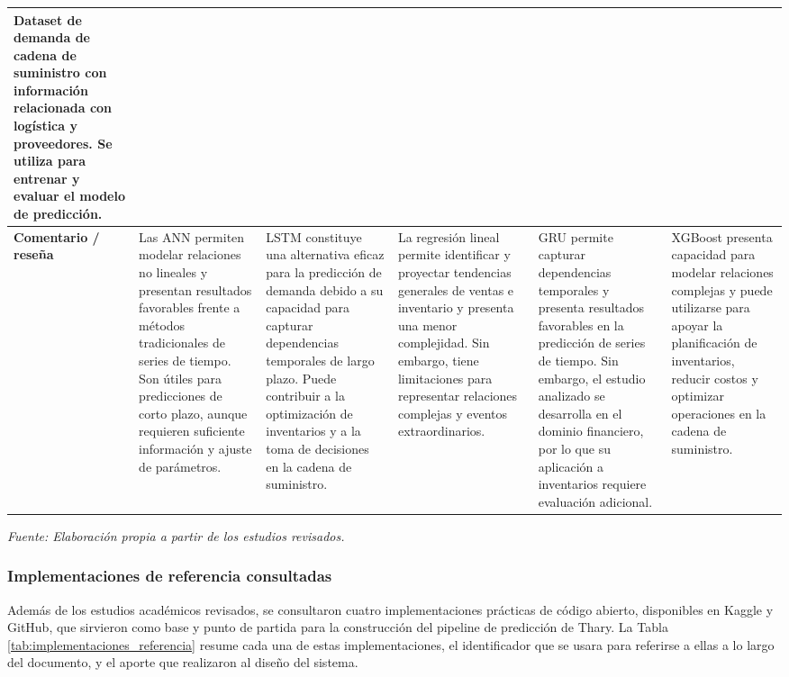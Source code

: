 \begin{table}[H]
{\begin{tabular}{|p{2.5cm}|p{4.5cm}|p{4.5cm}|p{4.5cm}|p{4.5cm}|p{4.5cm}|}
Dataset de demanda de cadena de suministro con información relacionada con logística y proveedores. Se utiliza para entrenar y evaluar el modelo de predicción. \\ 
\hline

\textbf{Comentario / reseña} &
Las ANN permiten modelar relaciones no lineales y presentan resultados favorables frente a métodos tradicionales de series de tiempo. Son útiles para predicciones de corto plazo, aunque requieren suficiente información y ajuste de parámetros. &
LSTM constituye una alternativa eficaz para la predicción de demanda debido a su capacidad para capturar dependencias temporales de largo plazo. Puede contribuir a la optimización de inventarios y a la toma de decisiones en la cadena de suministro. &
La regresión lineal permite identificar y proyectar tendencias generales de ventas e inventario y presenta una menor complejidad. Sin embargo, tiene limitaciones para representar relaciones complejas y eventos extraordinarios. &
GRU permite capturar dependencias temporales y presenta resultados favorables en la predicción de series de tiempo. Sin embargo, el estudio analizado se desarrolla en el dominio financiero, por lo que su aplicación a inventarios requiere evaluación adicional. &
XGBoost presenta capacidad para modelar relaciones complejas y puede utilizarse para apoyar la planificación de inventarios, reducir costos y optimizar operaciones en la cadena de suministro. \\ 
\hline

\end{tabular}%
}

\vspace{0.2cm}

\begin{flushleft}
\footnotesize
\textit{Fuente: Elaboración propia a partir de los estudios revisados.}
\end{flushleft}

\end{table}

\subsubsection{Implementaciones de referencia consultadas}

Además de los estudios académicos revisados, se consultaron cuatro implementaciones prácticas de código abierto, disponibles en Kaggle y GitHub, que sirvieron como base y punto de partida para la construcción del pipeline de predicción de Thary. La Tabla \ref{tab:implementaciones_referencia} resume cada una de estas implementaciones, el identificador que se usara para referirse a ellas a lo largo del documento, y el aporte que realizaron al diseño del sistema.

